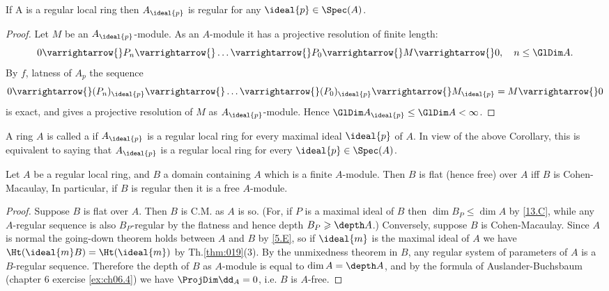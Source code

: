 \documentclass[../main]{subfiles}
\begin{document}
\begin{corollary} If A is a regular local ring then $A_{\ideal{p}}$ is regular for any $\ideal{p} \in \Spec(A)$.
\end{corollary}
\begin{proof}
Let $M$ be an $A_{\ideal{p}}$-module. As an $A$-module it has a projective resolution of finite length: \[0 \varrightarrow{} P_{n} \varrightarrow{} \dots \varrightarrow{} P_{0} \varrightarrow{} M\varrightarrow{} 0,\quad n \leq \GlDim A.\] By $f$, latness of $A_{p}$ the sequence \[0 \varrightarrow{}(P_{n})_{\ideal{p}} \varrightarrow{} \dots \varrightarrow{}(P_{0})_{\ideal{p}} \varrightarrow{} M_{\ideal{p}}=M \varrightarrow{} 0\] is exact, and gives a projective resolution of $M$ as $A_{\ideal{p}}$-module. Hence \newline $\GlDim A_{\ideal{p}} \leq \GlDim A<\infty$.
\end{proof} 
\begin{definition}
A ring $A$ is called a  if $A_{\ideal{p}}$ is a regular local ring for every maximal ideal $\ideal{p}$ of $A$. In view of the above Corollary, this is equivalent to saying that $A_{\ideal{p}}$ is a regular local ring for every $\ideal{p} \in \Spec(A)$.
\end{definition}

\begin{partheorem}\label{thm:046} Let $A$ be a regular local ring, and $B$ a
domain containing $A$ which is a finite $A$-module. Then $B$ is flat
(hence free) over $A$ iff $B$ is Cohen-Macaulay, In particular,
if $B$ is regular then it is a free $A$-module.
\end{partheorem} 

\begin{proof}Suppose $B$ is flat over $A$. Then $B$ is C.M. as $A$ is so. (For, if $P$ is a maximal ideal of $B$ then $\dim B_{P} \leqslant \dim A$ by \ref{13.C}, while any $A$-regular sequence is also $B_{P}$-regular by the flatness and hence depth $B_{P} \geqslant \depth A$.) Conversely, suppose $B$ is Cohen-Macaulay. Since $A$ is normal the going-down theorem holds between $A$ and $B$ by \ref{5.E}, so if $\ideal{m}$ is the maximal ideal of $A$ we have $\Ht(\ideal{m}B)=\Ht(\ideal{m})$ by Th.\ref{thm:019}(3). By the unmixedness theorem in $B$, any regular system of parameters of $A$ is a $B$-regular sequence. Therefore the depth of $B$ as $A$-module is equal to $\dim A=\depth A$, and by the formula of Auslander-Buchsbaum (chapter 6 exercise \ref{ex:ch06.4}) we have $\ProjDim \dd_{A}=0$, i.e. $B$ is $A$-free.
\end{proof}
\end{document}

